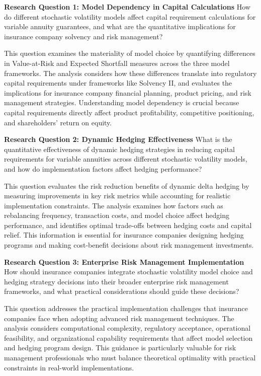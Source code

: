 \documentclass[12pt,a4paper]{report}
\begin{document}
\textbf{Research Question 1: Model Dependency in Capital Calculations}
How do different stochastic volatility models affect capital requirement calculations for variable annuity guarantees, and what are the quantitative implications for insurance company solvency and risk management?

This question examines the materiality of model choice by quantifying differences in Value-at-Risk and Expected Shortfall measures across the three model frameworks. The analysis considers how these differences translate into regulatory capital requirements under frameworks like Solvency II, and evaluates the implications for insurance company financial planning, product pricing, and risk management strategies. Understanding model dependency is crucial because capital requirements directly affect product profitability, competitive positioning, and shareholders' return on equity.

\textbf{Research Question 2: Dynamic Hedging Effectiveness}
What is the quantitative effectiveness of dynamic hedging strategies in reducing capital requirements for variable annuities across different stochastic volatility models, and how do implementation factors affect hedging performance?

This question evaluates the risk reduction benefits of dynamic delta hedging by measuring improvements in key risk metrics while accounting for realistic implementation constraints. The analysis examines how factors such as rebalancing frequency, transaction costs, and model choice affect hedging performance, and identifies optimal trade-offs between hedging costs and capital relief. This information is essential for insurance companies designing hedging programs and making cost-benefit decisions about risk management investments.

\textbf{Research Question 3: Enterprise Risk Management Implementation}
How should insurance companies integrate stochastic volatility model choice and hedging strategy decisions into their broader enterprise risk management frameworks, and what practical considerations should guide these decisions?

This question addresses the practical implementation challenges that insurance companies face when adopting advanced risk management techniques. The analysis considers computational complexity, regulatory acceptance, operational feasibility, and organizational capability requirements that affect model selection and hedging program design. This guidance is particularly valuable for risk management professionals who must balance theoretical optimality with practical constraints in real-world implementations.
\end{document}
